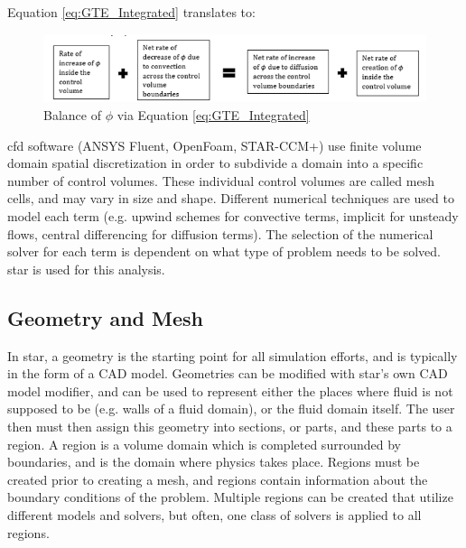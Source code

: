 \documentclass[double,12pt]{beavtex}
\begin{document}
Equation \ref{eq:GTE_Integrated} translates to:

\begin{figure}[!ht]
    \begin{center}
    	\includegraphics[width=13cm]{Figures/GTE_Balance.PNG}
    	\caption{Balance of $\phi$ via Equation \ref{eq:GTE_Integrated}}
    	\label{fig:GTE_Balance}
    	\end{center}
\end{figure}

\acrshort{cfd} software (ANSYS Fluent, OpenFoam, STAR-CCM+) use finite volume domain spatial discretization in order to subdivide a domain into a specific number of control volumes. These individual control volumes are called mesh cells, and may vary in size and shape. Different numerical techniques are used to model each term (e.g. upwind schemes for convective terms, implicit for unsteady flows, central differencing for diffusion terms). The selection of the numerical solver for each term is dependent on what type of problem needs to be solved. \acrshort{star} is used for this analysis.

\subsection{Geometry and Mesh}

In \acrshort{star}, a geometry is the starting point for all simulation efforts, and is typically in the form of a CAD model. Geometries can be modified with \acrshort{star}'s own CAD model modifier, and can be used to represent either the places where fluid is not supposed to be (e.g. walls of a fluid domain), or the fluid domain itself. The user then must then assign this geometry into sections, or parts, and these parts to a region. A region is a volume domain which is completed surrounded by boundaries, and is the domain where physics takes place. Regions must be created prior to creating a mesh, and regions contain information about the boundary conditions of the problem. Multiple regions can be created that utilize different models and solvers, but often, one class of solvers is applied to all regions.
\end{document}

